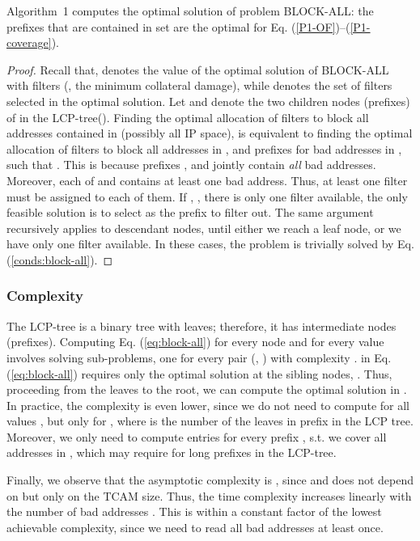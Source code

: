 \begin{theorem}
Algorithm~1 computes the optimal solution of problem BLOCK-ALL: the prefixes that are contained in set  are the optimal
 for Eq. (\ref{P1-OF})--(\ref{P1-coverage}).
\end{theorem}
\begin{proof}
Recall that,  denotes the value of the optimal solution of BLOCK-ALL with  filters
(\ie, the minimum collateral damage), while  denotes the  set of filters selected in the optimal solution.
Let  and  denote the two children nodes (prefixes) of  in the LCP-tree().
Finding the optimal allocation of  filters to block all addresses contained in  (possibly all IP space),
is equivalent to finding the optimal allocation of  filters to block all addresses in ,
and  prefixes for bad addresses in , such that .
This is because prefixes , and  jointly contain {\em all} bad addresses.
Moreover, each of  and  contains at least one bad address. Thus, at least one filter must be assigned to each of them.
If , \ie, there is only one filter available, the only feasible solution is to select  as the prefix to filter out.
The same argument recursively applies to descendant nodes, until either we reach a leaf node, or we have only one filter available.
In these cases, the problem is trivially solved by Eq. (\ref{conds:block-all}).
\end{proof}



\subsubsection*{Complexity} The LCP-tree is a binary tree with  leaves; therefore, it has  intermediate nodes (prefixes). Computing Eq. (\ref{eq:block-all}) for every node  and for every value  involves solving  sub-problems,
one for every pair (, ) with complexity .
 in Eq. (\ref{eq:block-all}) requires only the optimal solution at the
sibling nodes, . Thus, proceeding from the leaves to the root, we can compute the optimal solution in
. In practice, the complexity is even lower, since we do not need to compute  for all values
, but only for , where  is the number of the leaves in prefix  in the LCP tree.
Moreover, we only need to compute entries  for every prefix , s.t. we cover all addresses in , which may require  for long prefixes in the LCP-tree.




Finally, we observe that the asymptotic complexity is ,
since   and  does not depend on  but only on the TCAM size.
Thus, the time complexity increases linearly with the number of bad addresses .
This is within a constant factor of the lowest achievable complexity, since we need to read all  bad addresses at least once.




